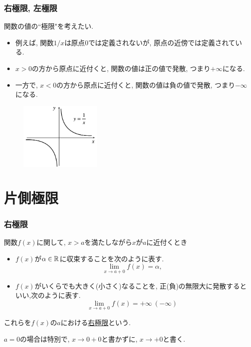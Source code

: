 

\begin{frame}
\frametitle{右極限, 左極限}

関数の値の``極限"を考えたい. 

\begin{itemize}
\item 例えば, 関数$1/x$は原点$0$では定義されないが, 原点の近傍では定義されている. 
\item $x>0$の方から原点に近付くと, 関数の値は正の値で発散, つまり$+\infty$になる. 
\item 一方で, $x<0$の方から原点に近付くと, 関数の値は負の値で発散, つまり$-\infty$になる. 
\end{itemize}

\vspace{-1mm}

 \begin{figure}[htbp]
 \begin{center} 
  \includegraphics[width=40mm]{calculus3/xinv.png}
 \end{center}
\end{figure}

\vspace{-1mm}

\end{frame}




\section{片側極限}

\begin{frame}
\frametitle{右極限}

\begin{Def}
関数$f(x)$に関して, $x > a$を満たしながら$x$が$a$に近付くとき
\begin{itemize}
\item $f(x)$が$\alpha \in \mathbb{R}$に収束することを次のように表す. 
$$
\lim_{x \to a +0} f(x)=\alpha, 
$$
\item $f(x)$がいくらでも大きく(小さく)なることを, 正(負)の無限大に発散するといい,次のように表す. 
$$
\lim_{x \to a +0} f(x)=+\infty \ (-\infty)
$$
\end{itemize}
これらを$f(x)$の$a$における\underline{右極限}という. 
\end{Def}

$a=0$の場合は特別で, $x \to 0+0$と書かずに, $x\to +0$と書く. 

\end{frame}


